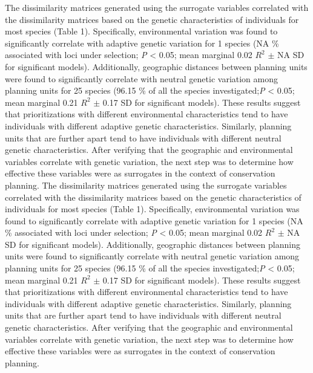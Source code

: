 \documentclass[11pt,]{article}
\begin{document}
The dissimilarity matrices generated using the surrogate variables
correlated with the dissimilarity matrices based on the genetic
characteristics of individuals for most species (Table 1). Specifically,
environmental variation was found to significantly correlate with
adaptive genetic variation for 1 species (NA \% associated with loci
under selection; \emph{P} \textless{} 0.05; mean marginal 0.02 \(R^2\)
\(\pm\) NA SD for significant models). Additionally, geographic
distances between planning units were found to significantly correlate
with neutral genetic variation among planning units for 25 species
(96.15 \% of all the species investigated;\emph{P} \textless{} 0.05;
mean marginal 0.21 \(R^2\) \(\pm\) 0.17 SD for significant models).
These results suggest that prioritizations with different environmental
characteristics tend to have individuals with different adaptive genetic
characteristics. Similarly, planning units that are further apart tend
to have individuals with different neutral genetic characteristics.
After verifying that the geographic and environmental variables
correlate with genetic variation, the next step was to determine how
effective these variables were as surrogates in the context of
conservation planning. The dissimilarity matrices generated using the
surrogate variables correlated with the dissimilarity matrices based on
the genetic characteristics of individuals for most species (Table 1).
Specifically, environmental variation was found to significantly
correlate with adaptive genetic variation for 1 species (NA \%
associated with loci under selection; \emph{P} \textless{} 0.05; mean
marginal 0.02 \(R^2\) \(\pm\) NA SD for significant models).
Additionally, geographic distances between planning units were found to
significantly correlate with neutral genetic variation among planning
units for 25 species (96.15 \% of all the species investigated;\emph{P}
\textless{} 0.05; mean marginal 0.21 \(R^2\) \(\pm\) 0.17 SD for
significant models). These results suggest that prioritizations with
different environmental characteristics tend to have individuals with
different adaptive genetic characteristics. Similarly, planning units
that are further apart tend to have individuals with different neutral
genetic characteristics. After verifying that the geographic and
environmental variables correlate with genetic variation, the next step
was to determine how effective these variables were as surrogates in the
context of conservation planning.
\end{document}
